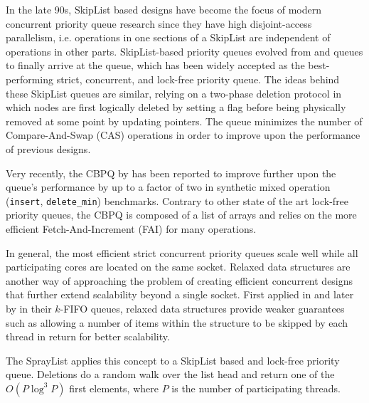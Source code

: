 \documentclass[a4paper,10pt]{article}
\begin{document}

In the late 90s, SkipList \cite{pugh1990skip,pugh1998concurrent} based designs have become the focus
of modern concurrent priority queue research
\cite{shavit2000skiplist,sundell2003fast,herlihy2012art,linden2013skiplist,alistarhspraylist}
since they have high disjoint-access parallelism, i.e. operations in one sections of a SkipList
are independent of operations in other parts.
SkipList-based priority queues evolved from \citeauthor{shavit2000skiplist}
\cite{shavit2000skiplist} and \citeauthor{sundell2003fast} \cite{sundell2003fast} queues
to finally arrive at the \citeauthor{linden2013skiplist} \cite{linden2013skiplist} queue,
which has been widely accepted as the best-performing strict, concurrent, and lock-free
priority queue. The ideas behind these SkipList queues are similar, relying on a two-phase deletion
protocol in which nodes are first logically deleted by setting a flag before being physically
removed at some point by updating pointers. The \citeauthor{linden2013skiplist} queue minimizes
the number of Compare-And-Swap (CAS) operations in order to improve upon the performance of previous
designs.


Very recently, the CBPQ by \citeauthor{cbpq} \cite{cbpq} has been reported to improve further upon
the \citeauthor{linden2013skiplist} queue's performance by up to a factor of two in synthetic
mixed operation (\lstinline|insert|, \lstinline|delete_min|) benchmarks. Contrary to other state of
the art lock-free priority queues, the CBPQ is composed of a list of arrays and relies on the
more efficient Fetch-And-Increment (FAI) for many operations.


In general, the most efficient strict concurrent priority queues scale well while
all participating cores are located on the same socket.
Relaxed data structures are another way of approaching the problem of creating efficient
concurrent designs that further extend scalability beyond a single socket.
First applied in \cite{afek2010quasi} and later by \citeauthor{kirsch2012fast} \cite{kirsch2012fast} in their
$k$-FIFO queues, relaxed data structures provide weaker guarantees such as allowing a number
of items within the structure to be skipped by each thread in return for better
scalability.

The SprayList \cite{alistarhspraylist} applies this concept to a SkipList based
and lock-free priority queue. Deletions do a random walk over the list head
and return one of the $O(P \log^3 P)$ first elements, where $P$ is the number of
participating threads.
\end{document}
